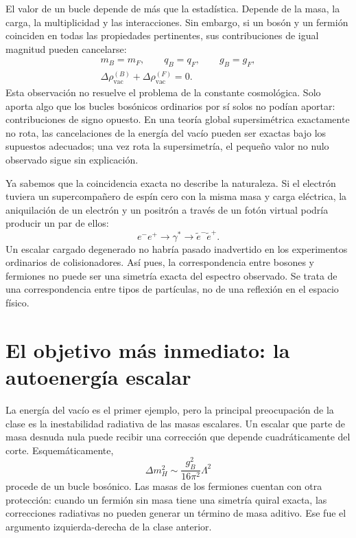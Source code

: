El valor de un bucle depende de más que la estadística. Depende de la masa, la carga, la multiplicidad y las interacciones. Sin embargo, si un bosón y un fermión coinciden en todas las propiedades pertinentes, sus contribuciones de igual magnitud pueden cancelarse:
\begin{equation}
\begin{gathered}
m_B=m_F,\qquad q_B=q_F,\qquad g_B=g_F,\\
\Delta\rho_{\mathrm{vac}}^{(B)}
+\Delta\rho_{\mathrm{vac}}^{(F)}=0.
\end{gathered}
\end{equation}
Esta observación no resuelve el problema de la constante cosmológica. Solo aporta algo que los bucles bosónicos ordinarios por sí solos no podían aportar: contribuciones de signo opuesto. En una teoría global supersimétrica exactamente no rota, las cancelaciones de la energía del vacío pueden ser exactas bajo los supuestos adecuados; una vez rota la supersimetría, el pequeño valor no nulo observado sigue sin explicación.

Ya sabemos que la coincidencia exacta no describe la naturaleza. Si el electrón tuviera un supercompañero de espín cero con la misma masa y carga eléctrica, la aniquilación de un electrón y un positrón a través de un fotón virtual podría producir un par de ellos:
\begin{equation}
e^-e^+\longrightarrow\gamma^*
\longrightarrow\widetilde e^-\widetilde e^+.
\end{equation}
Un escalar cargado degenerado no habría pasado inadvertido en los experimentos ordinarios de colisionadores. Así pues, la correspondencia entre bosones y fermiones no puede ser una simetría exacta del espectro observado. Se trata de una correspondencia entre tipos de partículas, no de una reflexión en el espacio físico.

\section{El objetivo más inmediato: la autoenergía escalar}

La energía del vacío es el primer ejemplo, pero la principal preocupación de la clase es la inestabilidad radiativa de las masas escalares. Un escalar que parte de masa desnuda nula puede recibir una corrección que depende cuadráticamente del corte. Esquemáticamente,
\begin{equation}
\Delta m_H^2\sim \frac{g_B^2}{16\pi^2}\Lambda^2
\end{equation}
procede de un bucle bosónico. Las masas de los fermiones cuentan con otra protección: cuando un fermión sin masa tiene una simetría quiral exacta, las correcciones radiativas no pueden generar un término de masa aditivo. Ese fue el argumento izquierda-derecha de la clase anterior.

